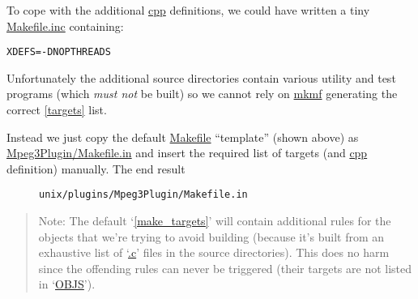 \documentclass{article}
\newcommand{\cmd}{\url}
\newcommand{\cmd}{\texttt}
\newenvironment{note}{\begin{quote}\color{red} Note: }{\end{quote}}
\begin{document}
To cope with the additional \cmd{cpp} definitions, we could have
written a tiny \cmd{Makefile.inc}
containing:

\begin{alltt}
    XDEFS   = -DNOPTHREADS
\end{alltt}

Unfortunately the additional source directories contain various
utility and test programs (which \emph{must not} be built) so we
cannot rely on \cmd{mkmf} generating the correct \cmd{[targets]} list.

Instead we just copy the default \cmd{Makefile} ``template'' (shown
above) as \cmd{Mpeg3Plugin/Makefile.in}
and insert the required list of targets (and \cmd{cpp}
definition) manually.  The end result
\begin{figure}[ht]
\begin{quote}\html{\begin{quote}}
\html{\end{quote}}\end{quote}
\caption{\texttt{unix/plugins/Mpeg3Plugin/Makefile.in}\label{fig:mf-mpeg}}
\end{figure}

\begin{note}
The default `\cmd{[make\_targets]}' will contain additional rules for the
objects that we're trying to avoid building (because it's built from
an exhaustive list of `\cmd{.c}' files in the source directories).  This
does no harm since the offending rules can never be triggered (their
targets are not listed in `\cmd{OBJS}').
\end{note}
\end{document}
